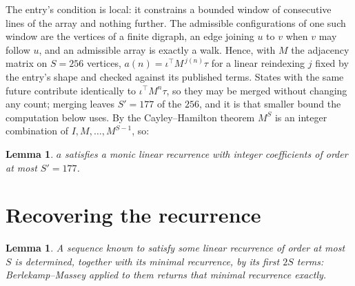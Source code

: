 \documentclass[11pt,a4paper]{article}
\theoremstyle{plain}
\newtheorem{lemma}[theorem]{Lemma}
\theoremstyle{definition}
\begin{document}
The entry's condition is local: it constrains a bounded window of consecutive lines of the
array and nothing further. The admissible configurations of one such window are the vertices
of a finite digraph, an edge joining $u$ to $v$ when $v$ may follow $u$, and an admissible
array is exactly a walk. Hence, with $M$ the adjacency matrix on $S=256$ vertices,
$a(n)=\iota^{\!\top}M^{\,j(n)}\tau$ for a linear reindexing $j$ fixed by the entry's shape
and checked against its published terms. States with the same future contribute identically to $\iota^{\!\top}M^n\tau$, so they may be merged without changing any count; merging leaves $S'=177$ of the $256$, and it is that smaller bound the computation below uses. By the Cayley--Hamilton theorem $M^{S}$ is an
integer combination of $I,M,\dots,M^{S-1}$, so:

\begin{lemma}\label{lem:cf}
$a$ satisfies a monic linear recurrence with integer coefficients of order at most
$S'=177$.
\end{lemma}

\section{Recovering the recurrence}

\begin{lemma}\label{lem:bm}
A sequence known to satisfy some linear recurrence of order at most $S$ is determined, together
with its minimal recurrence, by its first $2S$ terms: Berlekamp--Massey applied to them returns
that minimal recurrence exactly.
\end{lemma}
\end{document}
